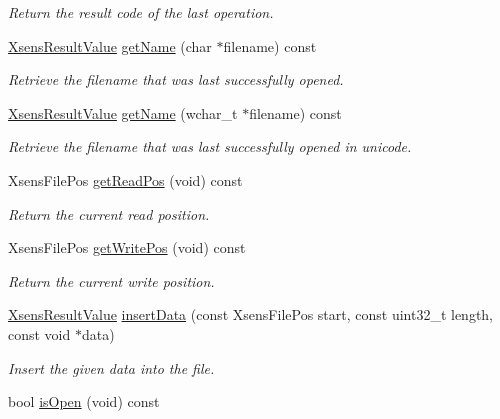 \begin{DoxyCompactItemize}
\begin{DoxyCompactList}\small\item\em \-Return the result code of the last operation. \end{DoxyCompactList}\item 
\hyperlink{group__enums_ga822a2260a20af524029eef9e9a51ff6f}{\-Xsens\-Result\-Value} \hyperlink{classxsens_1_1Cmt1f_a1447858cb01e173d8ee02f45e39a39f2}{get\-Name} (char $\ast$filename) const 
\begin{DoxyCompactList}\small\item\em \-Retrieve the filename that was last successfully opened. \end{DoxyCompactList}\item 
\hyperlink{group__enums_ga822a2260a20af524029eef9e9a51ff6f}{\-Xsens\-Result\-Value} \hyperlink{classxsens_1_1Cmt1f_a6cf9e6b889f186c2d2e41c877f01831e}{get\-Name} (wchar\-\_\-t $\ast$filename) const 
\begin{DoxyCompactList}\small\item\em \-Retrieve the filename that was last successfully opened in unicode. \end{DoxyCompactList}\item 
\hypertarget{classxsens_1_1Cmt1f_a50dd342eb0ff14be0439b20aaaa328e1}{\-Xsens\-File\-Pos \hyperlink{classxsens_1_1Cmt1f_a50dd342eb0ff14be0439b20aaaa328e1}{get\-Read\-Pos} (void) const }\label{classxsens_1_1Cmt1f_a50dd342eb0ff14be0439b20aaaa328e1}

\begin{DoxyCompactList}\small\item\em \-Return the current read position. \end{DoxyCompactList}\item 
\hypertarget{classxsens_1_1Cmt1f_a23d703467b142bddd066748489924e08}{\-Xsens\-File\-Pos \hyperlink{classxsens_1_1Cmt1f_a23d703467b142bddd066748489924e08}{get\-Write\-Pos} (void) const }\label{classxsens_1_1Cmt1f_a23d703467b142bddd066748489924e08}

\begin{DoxyCompactList}\small\item\em \-Return the current write position. \end{DoxyCompactList}\item 
\hyperlink{group__enums_ga822a2260a20af524029eef9e9a51ff6f}{\-Xsens\-Result\-Value} \hyperlink{classxsens_1_1Cmt1f_a7aaf400038c7dc83120eb0c166aa789d}{insert\-Data} (const \-Xsens\-File\-Pos start, const uint32\-\_\-t length, const void $\ast$data)
\begin{DoxyCompactList}\small\item\em \-Insert the given data into the file. \end{DoxyCompactList}\item 
\hypertarget{classxsens_1_1Cmt1f_a2068defb2740556214948f20b23e602c}{bool \hyperlink{classxsens_1_1Cmt1f_a2068defb2740556214948f20b23e602c}{is\-Open} (void) const }\label{classxsens_1_1Cmt1f_a2068defb2740556214948f20b23e602c}


\end{DoxyCompactItemize}
